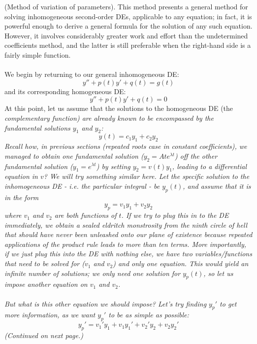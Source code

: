 \documentclass{article}
\begin{document}
\begin{method}
    (Method of variation of parameters). This method presents a general method for solving inhomogeneous second-order DEs, applicable to any equation; in fact, it is powerful enough to derive a general formula for the solution of any such equation. However, it involves considerably greater work and effort than the undetermined coefficients method, and the latter is still preferable when the right-hand side is a fairly simple function. \\ \\
    We begin by returning to our general inhomogeneous DE:
    \begin{equation*}
        y'' + p(t)y' + q(t) = g(t)
    \end{equation*}
    and its corresponding homogeneous DE:
    \begin{equation*}
        y'' + p(t)y' + q(t) = 0
    \end{equation*}
    At this point, let us assume that the solutions to the homogeneous DE (the \it complementary function\normalfont) are already known to be encompassed by the fundamental solutions $y_1$ and $y_2$:
    \begin{equation*}
        y(t) = c_1 y_1 + c_2 y_2
    \end{equation*}
    Recall how, in previous sections (repeated roots case in constant coefficients), we managed to obtain one fundamental solution ($y_2 = Ate^{\lambda t}$) off the other fundamental solution ($y_1 = e^{\lambda t}$) by setting $y_2 = v(t) y_1$, leading to a differential equation in $v$? We will try something similar here. Let the specific solution to the inhomogeneous DE - i.e. the \it particular integral \normalfont - be $y_p(t)$, and assume that it is in the form
    \begin{equation*}
        y_p = v_1 y_1 + v_2 y_2
    \end{equation*}
    where $v_1$ and $v_2$ are both functions of $t$. If we try to plug this in to the DE immediately, we obtain a sealed eldritch monstrosity from the ninth circle of hell that should have never been unleashed onto our plane of existence because repeated applications of the product rule leads to more than ten terms. More importantly, if we just plug this into the DE with nothing else, we have two variables/functions that need to be solved for ($v_1$ and $v_2$) and only one equation. This would yield an infinite number of solutions; we only need one solution for $y_p(t)$, so let us impose another equation on $v_1$ and $v_2$. \\ \\
    But what is this other equation we should impose? Let's try finding $y_p'$ to get more information, as we want $y_p'$ to be as simple as possible:
    \begin{equation*}
        y_p' = v_1'y_1 + v_1y_1' + v_2'y_2 + v_2y_2'
    \end{equation*}
    (Continued on next page.)
\end{method}
\end{document}
